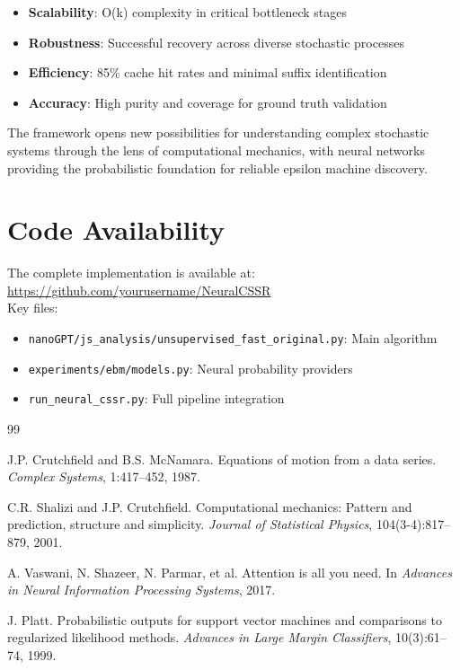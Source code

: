 \documentclass[12pt]{article}
\begin{document}
\begin{itemize}
    \item \textbf{Scalability}: O(k) complexity in critical bottleneck stages
    \item \textbf{Robustness}: Successful recovery across diverse stochastic processes
    \item \textbf{Efficiency}: 85\% cache hit rates and minimal suffix identification
    \item \textbf{Accuracy}: High purity and coverage for ground truth validation
\end{itemize}

The framework opens new possibilities for understanding complex stochastic systems through the lens of computational mechanics, with neural networks providing the probabilistic foundation for reliable epsilon machine discovery.

\section{Code Availability}

The complete implementation is available at: \\
\url{https://github.com/yourusername/NeuralCSSR} \\

Key files:
\begin{itemize}
    \item \texttt{nanoGPT/js\_analysis/unsupervised\_fast\_original.py}: Main algorithm
    \item \texttt{experiments/ebm/models.py}: Neural probability providers
    \item \texttt{run\_neural\_cssr.py}: Full pipeline integration
\end{itemize}


\begin{thebibliography}{99}

J.P. Crutchfield and B.S. McNamara.
\newblock Equations of motion from a data series.
\newblock \emph{Complex Systems}, 1:417--452, 1987.

C.R. Shalizi and J.P. Crutchfield.
\newblock Computational mechanics: Pattern and prediction, structure and simplicity.
\newblock \emph{Journal of Statistical Physics}, 104(3-4):817--879, 2001.

A. Vaswani, N. Shazeer, N. Parmar, et al.
\newblock Attention is all you need.
\newblock In \emph{Advances in Neural Information Processing Systems}, 2017.

J. Platt.
\newblock Probabilistic outputs for support vector machines and comparisons to regularized likelihood methods.
\newblock \emph{Advances in Large Margin Classifiers}, 10(3):61--74, 1999.

\end{thebibliography}
\end{document}
